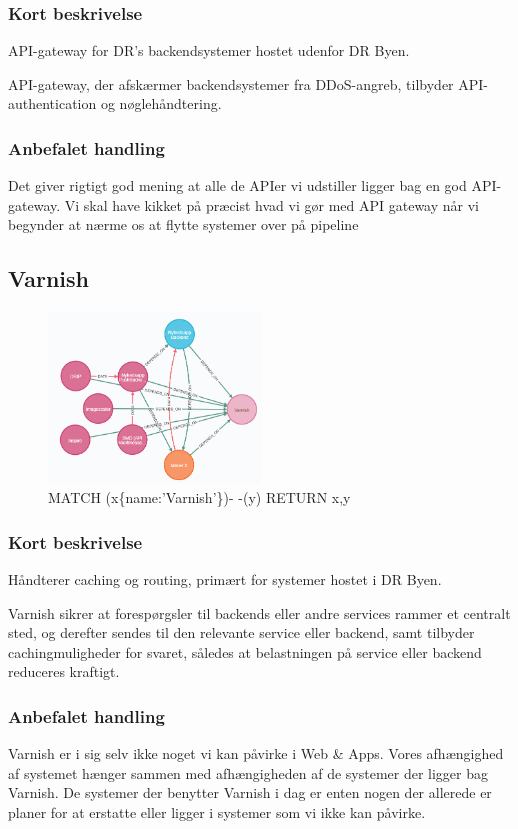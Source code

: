 \documentclass{article}
\begin{document}
\subsubsection{Kort beskrivelse}
API-gateway for DR's backendsystemer hostet udenfor DR Byen.

API-gateway, der afskærmer backendsystemer fra DDoS-angreb, tilbyder API-authentication og nøglehåndtering.
\subsubsection{Anbefalet handling}
Det giver rigtigt god mening at alle de APIer vi udstiller ligger bag en god API-gateway. Vi skal have kikket på præcist hvad vi gør med API gateway når vi begynder at nærme os at flytte systemer over på pipeline


\subsection{Varnish}
\begin{figure}[h]
\includegraphics[width=160pt]{Varnish.PNG}
\caption{MATCH (x\{name:'Varnish'\})- -(y) RETURN x,y}
\end{figure}
\subsubsection{Kort beskrivelse}
Håndterer caching og routing, primært for systemer hostet i DR Byen.

Varnish sikrer at forespørgsler til backends eller andre services rammer et centralt sted, og derefter sendes til den relevante service eller backend, samt tilbyder cachingmuligheder for svaret, således at belastningen på service eller backend reduceres kraftigt.
\subsubsection{Anbefalet handling}
Varnish er i sig selv ikke noget vi kan påvirke i Web \& Apps. Vores afhængighed af systemet hænger sammen med afhængigheden af de systemer der ligger bag Varnish. 
De systemer der benytter Varnish i dag er enten nogen der allerede er planer for at erstatte eller ligger i systemer som vi ikke kan påvirke.
\end{document}
